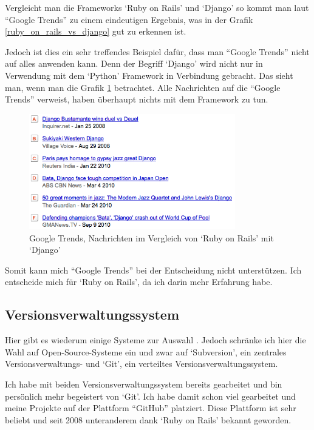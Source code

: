 Vergleicht man die Frameworks `Ruby on Rails' und `Django' so kommt man laut ``Google Trends''
zu einem eindeutigen Ergebnis, was in der Grafik \ref{ruby_on_rails_vs_django} gut
zu erkennen ist.

Jedoch ist dies ein sehr treffendes Beispiel dafür, dass man ``Google Trends'' nicht auf
alles anwenden kann. Denn der Begriff `Django' wird nicht nur in Verwendung
mit dem `Python' Framework in Verbindung gebracht. Das sieht man, wenn man die Grafik
\ref{django_meldungen} betrachtet. Alle Nachrichten auf die ``Google Trends'' verweist,
haben überhaupt nichts mit dem Framework zu tun.

\begin{figure}[ht]
    \begin{center}
        \includegraphics[width=0.8\textwidth,angle=0]{./bilder/django_meldungen.png}
        \caption{Google Trends, Nachrichten im Vergleich von `Ruby on Rails' mit `Django'}
        \label{django_meldungen}
    \end{center}
\end{figure}

Somit kann mich ``Google Trends'' bei der Entscheidung nicht unterstützen. Ich
entscheide mich für `Ruby on Rails', da ich darin mehr Erfahrung habe.

\clearpage

\subsection{Versionsverwaltungssystem}
Hier gibt es wiederum einige Systeme zur Auswahl \cite{versionsverwaltung}.
Jedoch schränke ich hier die Wahl auf Open-Source-Systeme ein und zwar auf
`Subversion', ein zentrales Versionsverwaltungs- und `Git', ein
verteiltes Versionsverwaltungssystem.

Ich habe mit beiden Versionsverwaltungssystem bereits gearbeitet und bin persönlich
mehr begeistert von `Git'. Ich habe damit schon viel gearbeitet und meine Projekte
auf der Plattform ``GitHub'' platziert. Diese Plattform ist sehr beliebt \cite{github}
und seit 2008 unteranderem dank `Ruby on Rails' bekannt geworden.


